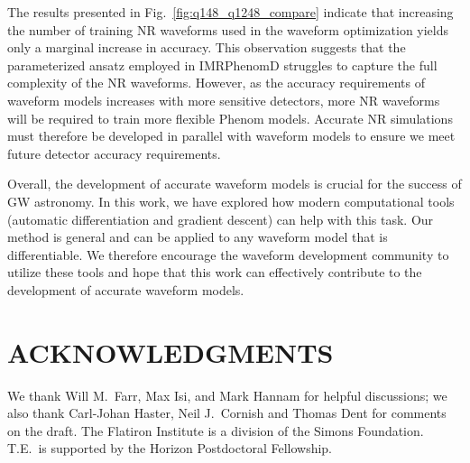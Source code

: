 \documentclass[twocolumn]{aastex631}
\begin{document}
The results presented in Fig.~\ref{fig:q148_q1248_compare} indicate that
increasing the number of training NR waveforms used in the waveform optimization yields
only a marginal increase in accuracy. This observation suggests that the parameterized ansatz employed 
in IMRPhenomD struggles to capture the full complexity of the NR waveforms. 
However, as the accuracy requirements of waveform models increases with more sensitive detectors,
more NR waveforms will be required to train more flexible Phenom models. 
Accurate NR simulations must therefore be developed in parallel with waveform models
to ensure we meet future detector accuracy requirements.

Overall, the development of accurate waveform models is crucial for the success of GW astronomy.
In this work, we have explored how modern computational tools (automatic differentiation and gradient descent)
can help with this task. 
Our method is general and can be applied to any waveform model that is differentiable.
We therefore encourage the waveform development community to utilize these tools
and hope that this work can effectively contribute to the development of accurate waveform models.

\section{ACKNOWLEDGMENTS}

We thank Will M.~Farr, Max Isi, and Mark Hannam for helpful discussions; we also
thank Carl-Johan Haster, Neil J.~Cornish and Thomas Dent for comments on the
draft. The Flatiron Institute is a division of the Simons Foundation. T.E.\ is
supported by the Horizon Postdoctoral Fellowship.


\end{document}
